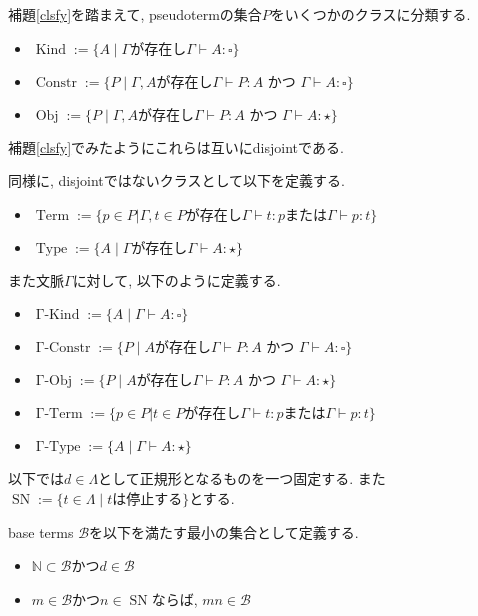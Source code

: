 \documentclass[12pt, titlepage]{ltjsarticle}
\DeclareMathOperator{\SN}{SN}
\DeclareMathOperator{\Term}{Term}
\DeclareMathOperator{\Obj}{Obj}
\DeclareMathOperator{\Constr}{Constr}
\DeclareMathOperator{\Type}{Type}
\DeclareMathOperator{\Kind}{Kind}
\DeclareMathOperator{\GTerm}{\Gamma-Term}
\DeclareMathOperator{\GObj}{\Gamma-Obj}
\DeclareMathOperator{\GConstr}{\Gamma-Constr}
\DeclareMathOperator{\GType}{\Gamma-Type}
\DeclareMathOperator{\GKind}{\Gamma-Kind}
\begin{document}
\begin{defn}
補題\ref{clsfy}を踏まえて, pseudotermの集合$P$をいくつかのクラスに分類する.
 \begin{itemize}
  \item $\Kind := \{ A \mid \Gamma \text{が存在し} \Gamma \vdash A \colon {\square}\}$
  \item $\Constr := \{ P \mid \Gamma, A \text{が存在し} \Gamma \vdash P \colon A \text{ かつ } \Gamma \vdash A \colon {\square}\}$
  \item $\Obj := \{ P \mid \Gamma, A \text{が存在し} \Gamma \vdash P \colon A \text{ かつ } \Gamma \vdash A \colon {\star}\}$
 \end{itemize}
 補題\ref{clsfy}でみたようにこれらは互いにdisjointである.
 
 同様に, disjointではないクラスとして以下を定義する.
 \begin{itemize}
  \item $\Term := \{p \in P | \Gamma, t \in P\text {が存在し} \Gamma \vdash t : p \text{または} \Gamma \vdash p : t \}$
  \item $\Type := \{ A \mid \Gamma \text{が存在し} \Gamma \vdash A \colon {\star}\}$
 \end{itemize}
 
また文脈$\Gamma$に対して, 以下のように定義する.
 \begin{itemize}
  \item $\GKind := \{ A \mid \Gamma \vdash A \colon {\square}\}$
  \item $\GConstr := \{ P \mid A \text{が存在し} \Gamma \vdash P \colon A \text{ かつ } \Gamma \vdash A \colon {\square}\}$
  \item $\GObj := \{ P \mid A \text{が存在し} \Gamma \vdash P \colon A \text{ かつ } \Gamma \vdash A \colon {\star}\}$
  \item $\GTerm := \{p \in P | t \in P\text {が存在し} \Gamma \vdash t : p \text{または} \Gamma \vdash p : t \}$
  \item $\GType := \{ A \mid \Gamma \vdash A \colon {\star}\}$
 \end{itemize}
\end{defn}

以下では$d \in \Lambda$として正規形となるものを一つ固定する. また$\SN := \{ t \in \Lambda \mid t \text{は停止する}\}$とする.

\begin{defn}
 base terms $\mathcal{B}$を以下を満たす最小の集合として定義する.
 \begin{itemize}
  \item $\mathbb{N} \subset \mathcal{B}$かつ$d \in \mathcal{B}$
  \item $m \in \mathcal{B}$かつ$n \in \SN$ならば, $mn \in \mathcal{B}$
 \end{itemize}
\end{defn}
\end{document}
